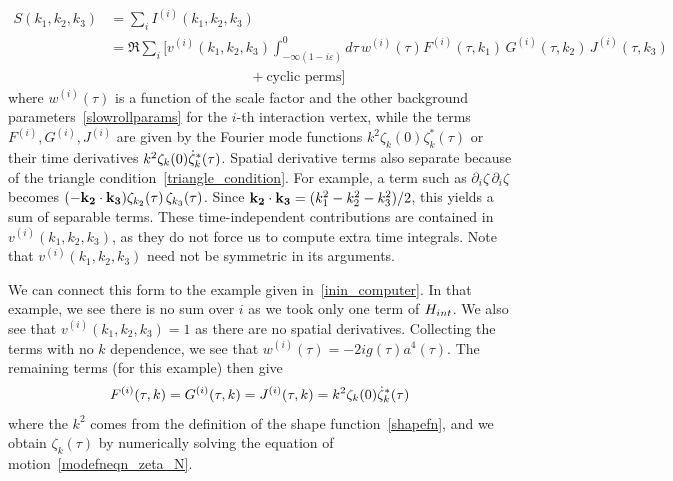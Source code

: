 \begin{align}\label{inin_sep}
    S(k_1, k_2,k_3) &= \sum_i I^{(i)} (k_1, k_2,k_3)\nonumber \\
    &= \Re\sum_i \bigg[ v^{(i)}(k_1, k_2,k_3) \int^0_{-\infty(1-i\varepsilon)} d\tau\, w^{(i)}(\tau) F^{(i)}(\tau,k_1)\, G^{(i)}(\tau,k_2)\,J^{(i)}(\tau,k_3)\nonumber\\
    &\quad\quad\quad\quad\quad\quad\quad\quad\quad\quad+ \text{cyclic perms}  \bigg] 
\end{align}
where $w^{(i)}(\tau)$ is a function of the scale factor and the other background parameters~\eqref{slowrollparams} for the $i$-th interaction vertex, while the terms $F^{(i)}, G^{(i)}, J^{(i)}$ are given by the Fourier mode functions $k^2\zeta_{k}(0)\zeta^{*}_{k}(\tau)$ or their time derivatives $k^2\zeta_{k}(0)\dot{\zeta}^{*}_{k}(\tau)$.
Spatial derivative terms also separate because of the triangle condition~\eqref{triangle_condition}.
For example, a term such as  $\partial_i \zeta\, \partial_i\zeta$ becomes
$(-{\bf k_2}\cdot {\bf k_3} )\zeta_{{k}_2}(\tau)\, \zeta_{{k}_3}(\tau)$.
Since  ${\bf k_2}\cdot {\bf k_3} = (k_1^2 - k_2^2-k_3^2)/2$, this yields a sum of separable terms.
These time-independent contributions are contained in $v^{(i)}(k_1, k_2,k_3)$,
as they do not force us to compute extra time integrals.
Note that $v^{(i)}(k_1, k_2,k_3)$ need not be symmetric in its arguments.


We can connect this form to the example given in~\eqref{inin_computer}.
In that example, we see there is no sum over $i$ as we took only one term of $H_{int}$.
We also see that $v^{(i)}(k_1,k_2,k_3)=1$ as there are no spatial derivatives.
Collecting the terms with no $k$ dependence, we see that
$w^{(i)}(\tau)=-2ig(\tau)a^4(\tau)$.
The remaining terms (for this example) then give
\begin{align}
    F^{(i)}(\tau,k) = G^{(i)}(\tau,k) = J^{(i)}(\tau,k) = k^2\zeta_k(0)\dot{\zeta}_k^*(\tau)
\end{align}
where the $k^2$ comes from the definition of the shape function~\eqref{shapefn},
and we obtain $\zeta_k(\tau)$ by numerically solving the equation of motion~\eqref{modefneqn_zeta_N}.


